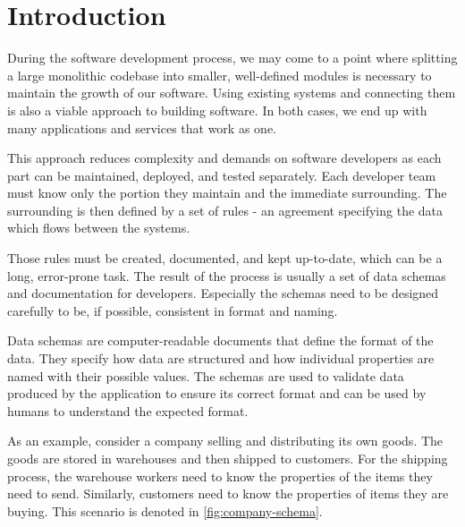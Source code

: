 \chapter*{Introduction}


During the software development process, we may come to a point where splitting a large monolithic codebase into smaller, well-defined modules is necessary to maintain the growth of our software. Using existing systems and connecting them is also a viable approach to building software. \cite{newman_monolith_nodate} In both cases, we end up with many applications and services that work as one.

This approach reduces complexity and demands on software developers as each part can be maintained, deployed, and tested separately. Each developer team must know only the portion they maintain and the immediate surrounding. The surrounding is then defined by a set of rules - an agreement specifying the data which flows between the systems.

Those rules must be created, documented, and kept up-to-date, which can be a long, error-prone task. The result of the process is usually a set of data schemas and documentation for developers. Especially the schemas need to be designed carefully to be, if possible, consistent in format and naming.

Data schemas are computer-readable documents that define the format of the data. They specify how data are structured and how individual properties are named with their possible values. The schemas are used to validate data produced by the application to ensure its correct format and can be used by humans to understand the expected format.

\medskip

As an example, consider a company selling and distributing its own goods. The goods are stored in warehouses and then shipped to customers. For the shipping process, the warehouse workers need to know the properties of the items they need to send. Similarly, customers need to know the properties of items they are buying. This scenario is denoted in \autoref{fig:company-schema}.

